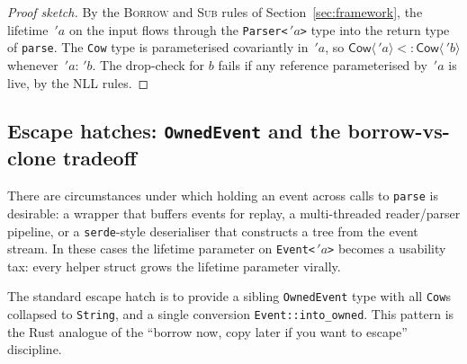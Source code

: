 \documentclass[12pt]{article}
\theoremstyle{definition}
\theoremstyle{remark}
\newcommand{\lifetime}[1]{\ensuremath{\,'\!#1}}
\newcommand{\subtype}{\ensuremath{<:}}
\newcommand{\outlives}{\ensuremath{:}}
\begin{document}
\begin{proof}[Proof sketch]
By the \textsc{Borrow} and \textsc{Sub} rules of Section~\ref{sec:framework},
the lifetime $\lifetime{a}$ on the input flows through the
\texttt{Parser<\lifetime{a}>} type into the return type of \texttt{parse}.
The \texttt{Cow} type is parameterised covariantly in $\lifetime{a}$, so
$\mathsf{Cow}\langle\lifetime{a}\rangle \subtype \mathsf{Cow}\langle\lifetime{b}\rangle$
whenever $\lifetime{a} \outlives \lifetime{b}$. The drop-check for $b$
fails if any reference parameterised by $\lifetime{a}$ is live, by the
NLL rules.
\end{proof}

\subsection{Escape hatches: \texttt{OwnedEvent} and the borrow-vs-clone tradeoff}

There are circumstances under which holding an event across calls to
\texttt{parse} is desirable: a wrapper that buffers events for replay, a
multi-threaded reader/parser pipeline, or a \texttt{serde}-style deserialiser
that constructs a tree from the event stream. In these cases the lifetime
parameter on \texttt{Event<\lifetime{a}>} becomes a usability tax: every
helper struct grows the lifetime parameter virally.

The standard escape hatch is to provide a sibling \texttt{OwnedEvent} type
with all \texttt{Cow}s collapsed to \texttt{String}, and a single conversion
\texttt{Event::into\_owned}. This pattern is the Rust analogue of the
``borrow now, copy later if you want to escape'' discipline.
\end{document}
